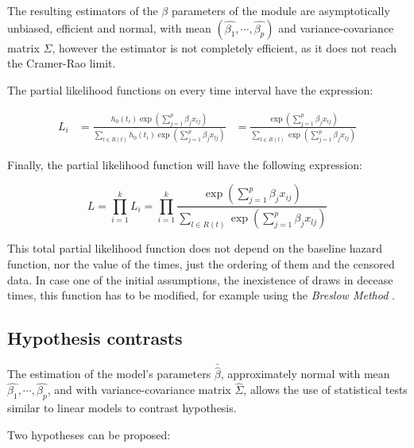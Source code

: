 \documentclass[11pt]{book} %
\begin{document}
      The resulting estimators of the $\beta$ parameters of the module are asymptotically unbiased, efficient and normal, with mean $(\widehat{\beta_1},\cdots,\widehat{\beta_p})$ and variance-covariance matrix $\widehat{\Sigma}$, however the estimator is not completely efficient, as it does not reach the Cramer-Rao limit.

      The partial likelihood functions on every time interval have the expression:

      \begin{equation}
        \begin{aligned}
          L_i & = \frac{h_0(t_i)\exp\left(\sum_{j=1}^p\beta_jx_{ij}\right)}{\sum_{l\in R(t)}h_0(t_i)\exp\left(\sum_{j=1}^p\beta_jx_{lj}\right)}
          & = \frac{\exp\left(\sum_{j=1}^p\beta_jx_{ij}\right)}{\sum_{l\in R(t)}\exp\left(\sum_{j=1}^p\beta_jx_{lj}\right)}
        \end{aligned}
        \label{eq:cox-partial-likelihood-expression}
      \end{equation}

      Finally, the partial likelihood function will have the following expression:

      \begin{equation}
        L = \prod_{i=1}^k L_i= \prod_{i=1}^k \frac{\exp\left(\sum_{j=1}^p\beta_jx_{ij}\right)}{\sum_{l\in R(t)}\exp\left(\sum_{j=1}^p\beta_jx_{lj}\right)}
        \label{eq:cox-total-partial-likelihood-function}
      \end{equation}

      This total partial likelihood function does not depend on the baseline hazard function, nor the value of the times, just the ordering of them and the censored data. In case one of the initial assumptions, the inexistence of draws in decease times, this function has to be modified, for example using the \emph{Breslow Method} \cite{breslow-method}.

    \subsection{Hypothesis contrasts}

      The estimation of the model's parameters $\bar{\widehat{\beta}}$, approximately normal with mean ${\widehat{\beta_1},\cdots,\widehat{\beta_p}}$, and with variance-covariance matrix $\widehat{\Sigma}$, allows the use of statistical tests similar to linear models to contrast hypothesis.

      Two hypotheses can be proposed:
\end{document}

